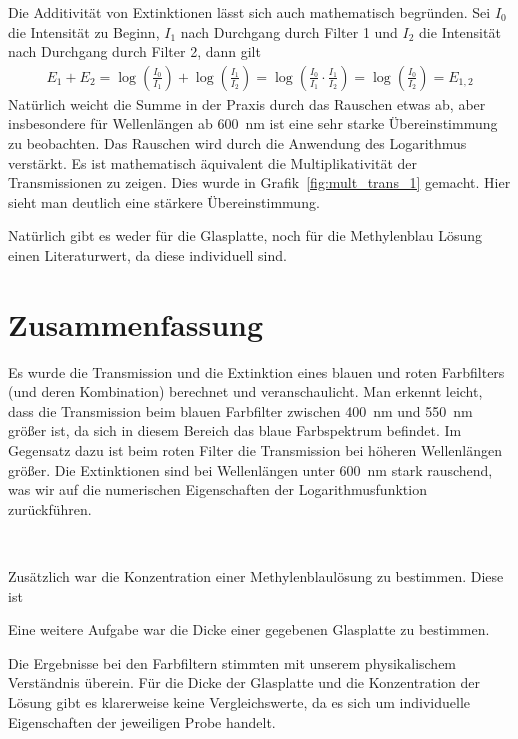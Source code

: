 \documentclass{article}
\begin{document}
Die Additivität von Extinktionen lässt sich auch mathematisch begründen. Sei $I_0$ die Intensität zu Beginn, $I_1$ nach Durchgang durch Filter 1 und $I_2$ die Intensität nach Durchgang durch Filter 2, dann gilt
\begin{align*}
E_1 + E_2 = \log\left(\frac{I_0}{I_1}\right) + \log\left(\frac{I_1}{I_2}\right) = \log\left(\frac{I_0}{I_1}\cdot \frac{I_1}{I_2}\right) = \log\left(\frac{I_0}{I_2}\right) = E_{1,2}
\end{align*}
Natürlich weicht die Summe in der Praxis durch das Rauschen etwas ab, aber insbesondere für Wellenlängen ab 600~nm ist eine sehr starke Übereinstimmung zu beobachten. Das Rauschen wird durch die Anwendung des Logarithmus verstärkt. Es ist mathematisch äquivalent die Multiplikativität der Transmissionen zu zeigen. Dies wurde in Grafik~\ref{fig:mult_trans_1} gemacht. Hier sieht man deutlich eine stärkere Übereinstimmung.

Natürlich gibt es weder für die Glasplatte, noch für die Methylenblau Lösung einen Literaturwert, da diese individuell sind.







\section{Zusammenfassung}

Es wurde die Transmission und die Extinktion eines blauen und roten Farbfilters (und deren Kombination) berechnet und veranschaulicht. Man erkennt leicht, dass die Transmission beim blauen Farbfilter zwischen 400~nm und 550~nm größer ist, da sich in diesem Bereich das blaue Farbspektrum befindet. Im Gegensatz dazu ist beim roten Filter die Transmission bei höheren Wellenlängen größer. Die Extinktionen sind bei Wellenlängen unter 600~nm stark rauschend, was wir auf die numerischen Eigenschaften der Logarithmusfunktion zurückführen. 

~

Zusätzlich war die Konzentration einer Methylenblaulösung zu bestimmen. Diese ist


Eine weitere Aufgabe war die Dicke einer gegebenen Glasplatte zu bestimmen.



Die Ergebnisse bei den Farbfiltern stimmten mit unserem physikalischem Verständnis überein. Für die Dicke der Glasplatte und die Konzentration der Lösung gibt es klarerweise keine Vergleichswerte, da es sich um individuelle Eigenschaften der jeweiligen Probe handelt.
\end{document}
